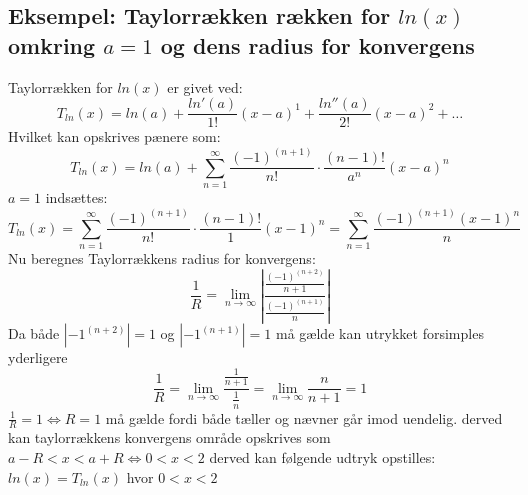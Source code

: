 \subsection*{\textbf{Eksempel:} Taylorrækken rækken for $ln(x)$ omkring $a = 1$ og dens radius for konvergens} %
Taylorrækken for $ln(x)$ er givet ved:
\[
    T_{ln}(x) = ln(a) + \frac{ln'(a)}{1!}(x-a)^1 + \frac{ln''(a)}{2!}(x-a)^2 + \ldots
\]
Hvilket kan opskrives pænere som:
\[
    T_{ln}(x) = ln(a) + \sum^{\infty}_{n = 1} \frac{(-1)^{(n+1)}}{n!} \cdot \frac{(n-1)!}{a^n} (x-a)^{n}
\]
$a = 1$ indsættes:
\[
    T_{ln}(x) = \sum^{\infty}_{n = 1} \frac{(-1)^{(n+1)}}{n!} \cdot \frac{(n-1)!}{1} (x-1)^{n}
    = \sum^{\infty}_{n = 1} \frac{(-1)^{(n+1)}(x-1)^{n}}{n}
\]
Nu beregnes Taylorrækkens radius for konvergens: 
\[
    \frac{1}{R} = \lim_{n \rightarrow \infty} \left\lvert \frac{\frac{(-1)^{(n+2)}}{n+1}}{\frac{(-1)^{(n+1)}}{n}} \right\lvert
\]
Da både $\left\lvert -1^{(n+2)} \right\lvert = 1$ og $\left\lvert-1^{(n + 1)} \right\lvert = 1$ må gælde kan utrykket forsimples yderligere
\[
    \frac{1}{R} = \lim_{n \rightarrow \infty} \frac{\frac{1}{n+1}}{\frac{1}{n}} = \lim_{n \rightarrow \infty} \frac{n}{n+1} = 1
\]
$\frac{1}{R} = 1 \Leftrightarrow R = 1$ må gælde fordi både tæller og nævner går imod uendelig. 
derved kan taylorrækkens konvergens område opskrives som $a-R < x < a+R \Leftrightarrow 0 < x < 2$ 
derved kan følgende udtryk opstilles: $ln(x) = T_{ln}(x)$ hvor $ 0 < x < 2$